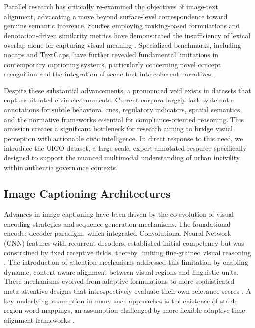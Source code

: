 \documentclass[lettersize,journal]{IEEEtran}
\begin{document}
	Parallel research has critically re-examined the objectives of image-text alignment, advocating a move beyond surface-level correspondence toward genuine semantic inference. Studies employing ranking-based formulations and denotation-driven similarity metrics have demonstrated the insufficiency of lexical overlap alone for capturing visual meaning \cite{hodosh2013framing, young2014image}. Specialized benchmarks, including nocaps and TextCaps, have further revealed fundamental limitations in contemporary captioning systems, particularly concerning novel concept recognition and the integration of scene text into coherent narratives \cite{agrawal2019nocaps, sidorov2020textcaps}.
	
	Despite these substantial advancements, a pronounced void exists in datasets that capture situated civic environments. Current corpora largely lack systematic annotations for subtle behavioral cues, regulatory indicators, spatial semantics, and the normative frameworks essential for compliance-oriented reasoning. This omission creates a significant bottleneck for research aiming to bridge visual perception with actionable civic intelligence. In direct response to this need, we introduce the UICO dataset, a large-scale, expert-annotated resource specifically designed to support the nuanced multimodal understanding of urban incivility within authentic governance contexts.
	
	
	
	\subsection{Image Captioning Architectures}
	
	Advances in image captioning have been driven by the co-evolution of visual encoding strategies and sequence generation mechanisms. The foundational encoder-decoder paradigm, which integrated Convolutional Neural Network (CNN) features with recurrent decoders, established initial competency but was constrained by fixed receptive fields, thereby limiting fine-grained visual reasoning \cite{vinyals2015show, 2016mscoco}. The introduction of attention mechanisms addressed this limitation by enabling dynamic, content-aware alignment between visual regions and linguistic units. These mechanisms evolved from adaptive formulations to more sophisticated meta-attentive designs that introspectively evaluate their own relevance scores \cite{lu2017knowing, huang2019attention}. A key underlying assumption in many such approaches is the existence of stable region-word mappings, an assumption challenged by more flexible adaptive-time alignment frameworks \cite{huang2019adaptively}.
	
\end{document}
